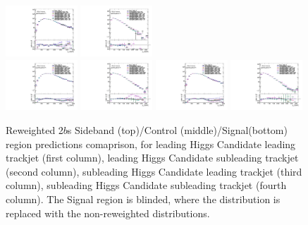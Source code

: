 \begin{figure}[htbp!]
\begin{center}
\includegraphics[angle=270, width=0.24\textwidth]{./figures/boosted/AppendixReweight/Compare/Data_TwoTag_split_Control_directcompare_sublHCand_trk0_Pt_1.pdf}
\includegraphics[angle=270, width=0.24\textwidth]{./figures/boosted/AppendixReweight/Compare/Data_TwoTag_split_Control_directcompare_sublHCand_trk1_Pt_1.pdf}\\
\includegraphics[angle=270, width=0.24\textwidth]{./figures/boosted/AppendixReweight/Compare/Data_TwoTag_split_Signal_directcompare_leadHCand_trk0_Pt_1.pdf}
\includegraphics[angle=270, width=0.24\textwidth]{./figures/boosted/AppendixReweight/Compare/Data_TwoTag_split_Signal_directcompare_leadHCand_trk1_Pt_1.pdf}
\includegraphics[angle=270, width=0.24\textwidth]{./figures/boosted/AppendixReweight/Compare/Data_TwoTag_split_Signal_directcompare_sublHCand_trk0_Pt_1.pdf}
\includegraphics[angle=270, width=0.24\textwidth]{./figures/boosted/AppendixReweight/Compare/Data_TwoTag_split_Signal_directcompare_sublHCand_trk1_Pt_1.pdf}\\
\caption{Reweighted 2$b$s Sideband (top)/Control (middle)/Signal(bottom) region predictions comaprison, for leading Higgs Candidate leading trackjet \pt (first column),  leading Higgs Candidate subleading trackjet \pt (second column), subleading Higgs Candidate leading trackjet \pt (third column), subleading Higgs Candidate subleading trackjet \pt (fourth column). The Signal region is blinded, where the distribution is replaced with the non-reweighted distributions.}
\label{fig:app-rw-comp-2bs-trkjet}
\end{center}
\end{figure}


